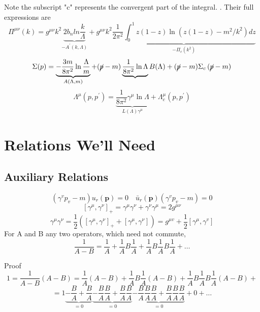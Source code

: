 Note the subscript "c" represents the convergent part of the integral. . Their full expressions are
\begin{equation}
\Pi^{\mu \nu}(k)=g^{\mu \nu} k^{2} \underbrace{2 b_{n} l n \frac{k}{\Lambda}}_{-A^{\prime}(k, \Lambda)}+g^{\mu \nu} k^{2} \underbrace{\frac{1}{2 \pi^{2}} \int_{0}^{1} z(1-z) \ln \left(z(1-z)-m^{2} / k^{2}\right) d z}_{-\Pi_{c}\left(k^{2}\right)}
\end{equation}
\begin{equation}\Sigma(p)=\underbrace{-\frac{3 m}{8 \pi^{2}} \ln \frac{\Lambda}{m}}_{A(\Lambda, m)}+(\cancel{p}-m) \underbrace{\frac{1}{8 \pi^{2}} \ln \Lambda}{B(\Lambda)}+(\cancel{p}-m) \Sigma_{c}\left(\cancel{p}-m\right)
\end{equation}
\begin{equation}\Lambda^{\mu}\left(p, p^{\prime}\right)=\underbrace{\frac{1}{8 \pi^{2}} \gamma^{\mu} \ln \Lambda}_{L(\Lambda) \gamma^{\mu}}+\Lambda_{c}^{\mu}\left(p, p^{\prime}\right)
\end{equation}

\section{Relations We'll Need}
\subsection{Auxiliary Relations}
\begin{equation}
\left(\gamma^{v} p_{v}-m\right) u_{r}(\mathbf{p})=0 \quad \bar{u}_{r}(\mathbf{p})\left(\gamma^{v} p_{v}-m\right)=0
\end{equation}
\begin{equation}
\left[\gamma^{\mu}, \gamma^{\nu}\right]_{+}=\gamma^{\mu} \gamma^{\nu}+\gamma^{\nu} \gamma^{\mu}=2 g^{\mu \nu}
\end{equation}
\begin{equation}\gamma^{\mu} \gamma^{\nu}=\frac{1}{2}\left(\left[\gamma^{\mu}, \gamma^{\nu}\right]_{+}+\left[\gamma^{\mu}, \gamma^{\nu}\right]\right)=g^{\mu v}+\frac{1}{2}\left[\gamma^{\mu}, \gamma^{v}\right]
\end{equation}
For A and B any two operators, which need not commute,
\begin{equation}
\frac{1}{A-B}=\frac{1}{A}+\frac{1}{A} B \frac{1}{A}+\frac{1}{A} B \frac{1}{A} B \frac{1}{A}+\ldots
\end{equation}
\begin{mybox}
Proof
$$
1=\frac{1}{A-B}(A-B)=\frac{1}{A}(A-B)+\frac{1}{A} B \frac{1}{A}(A-B)+\frac{1}{A} B \frac{1}{A} B \frac{1}{A}(A-B)+
$$
$$=1 \underbrace{-\frac{B}{A}+\frac{B}{A}}_{=0} \underbrace{-\frac{B}{A} \frac{B}{A}+\frac{B}{A} \frac{B}{A}}_{=0}\underbrace{-\frac{B}{A} \frac{B}{A} \frac{B}{A}+\frac{B}{A} \frac{B}{A} \frac{B}{A}}_{=0}+0+\ldots
$$
\end{mybox}
